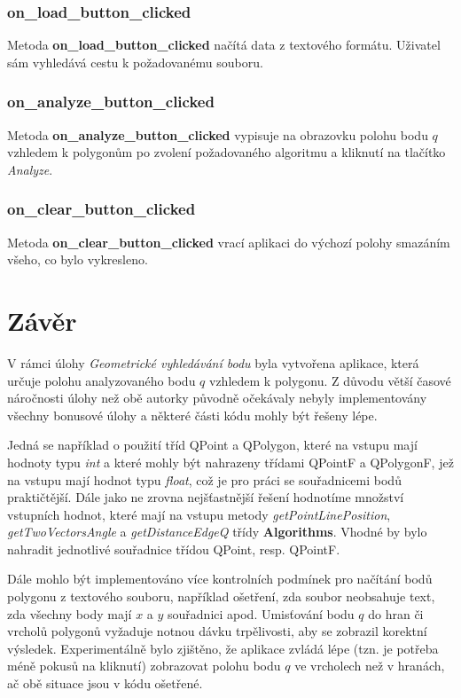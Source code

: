 \documentclass[a4paper, 12pt]{article}
\begin{document}
\subsubsection{on\_load\_button\_clicked}
Metoda \textbf{on\_load\_button\_clicked} načítá data z textového formátu. Uživatel sám vyhledává cestu k požadovanému souboru.

\subsubsection{on\_analyze\_button\_clicked}
Metoda \textbf{on\_analyze\_button\_clicked} vypisuje na obrazovku polohu bodu $q$ vzhledem k polygonům po zvolení požadovaného algoritmu a kliknutí na tlačítko \textsl{Analyze}.

\subsubsection{on\_clear\_button\_clicked}
Metoda \textbf{on\_clear\_button\_clicked} vrací aplikaci do výchozí polohy smazáním všeho, co bylo vykresleno. 

\clearpage
\section{Závěr}
V rámci úlohy \textit{Geometrické vyhledávání bodu} byla vytvořena aplikace, která určuje polohu analyzovaného bodu $q$ vzhledem k polygonu. Z důvodu větší časové náročnosti úlohy než obě autorky původně očekávaly nebyly implementovány všechny bonusové úlohy a některé části kódu mohly být řešeny lépe.  

Jedná se například o použití tříd QPoint a QPolygon, které na vstupu mají hodnoty typu \textit{int} a které mohly být nahrazeny třídami QPointF a QPolygonF, jež na vstupu mají hodnot typu \textit{float}, což je pro práci se souřadnicemi bodů praktičtější. Dále jako ne zrovna nejšťastnější řešení hodnotíme množství vstupních hodnot, které mají na vstupu metody \textit{getPointLinePosition}, \textit{getTwoVectorsAngle} a \textit{getDistanceEdgeQ} třídy \textbf{Algorithms}. Vhodné by bylo nahradit jednotlivé souřadnice třídou QPoint, resp. QPointF. 

Dále mohlo být implementováno více kontrolních podmínek pro načítání bodů polygonu z textového souboru, například ošetření, zda soubor neobsahuje text, zda všechny body mají $x$ a $y$ souřadnici apod. Umisťování bodu $q$ do hran či vrcholů polygonů vyžaduje notnou dávku trpělivosti, aby se zobrazil korektní výsledek. Experimentálně bylo zjištěno, že aplikace zvládá lépe (tzn. je potřeba méně pokusů na kliknutí) zobrazovat polohu bodu $q$ ve vrcholech než v hranách, ač obě situace jsou v kódu ošetřené. 
\end{document}
